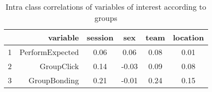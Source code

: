 \begin{table}[ht]
\centering
\begin{tabular}{rrcccc}
  \hline
 & variable & session & sex & team & location \\ 
  \hline
1 & PerformExpected & 0.06 & 0.06 & 0.08 & 0.01 \\ 
  2 & GroupClick & 0.14 & -0.03 & 0.09 & 0.08 \\ 
  3 & GroupBonding & 0.21 & -0.01 & 0.24 & 0.15 \\ 
   \hline
\end{tabular}
\caption{Intra class correlations of variables of interest according to groups} 
\label{tab:ICCTable}
\end{table}
